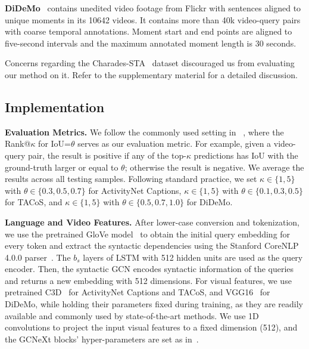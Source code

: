 \documentclass[10pt,twocolumn,letterpaper]{article}
\begin{document}
\noindent\textbf{DiDeMo}~\cite{Hendricks_2017_ICCV} contains unedited video footage from Flickr with sentences aligned to unique moments in its 10642 videos. It contains more than 40k video-query pairs with coarse temporal annotations. Moment start and end points are aligned to five-second intervals and the maximum annotated moment length is 30 seconds.

Concerns regarding the Charades-STA~\cite{Gao_2017_ICCV} dataset discouraged us from evaluating our method on it. Refer to the supplementary material for a detailed discussion. 



\subsection{Implementation}\label{subsec: Impl}
\noindent\textbf{Evaluation Metrics.}
We follow the commonly used setting in ~\cite{gao2017tall}, where the Rank@$\kappa$ for IoU=$\theta$ serves as our evaluation metric. 
For example, given a video-query pair, the result is positive if any of the top-$\kappa$ predictions has IoU with the ground-truth larger or equal to $\theta$; otherwise the result is negative. We average the results across all testing samples. Following standard practice, we set $\kappa \in\{1, 5\}$ with $\theta\in\{0.3,0.5,0.7\}$ for ActivityNet Captions,
$\kappa\in\{1, 5\}$ with $\theta\in\{0.1,0.3,0.5\}$ for TACoS,  and $\kappa\in\{1, 5\}$ with $\theta\in\{0.5,0.7, 1.0\}$ for DiDeMo. 



\noindent\textbf{Language and Video Features.}
After lower-case conversion and tokenization, we use the pretrained GloVe model~\cite{pennington2014glove} to obtain the initial query embedding for every token and extract the syntactic dependencies using the Stanford CoreNLP 4.0.0 parser~\cite{manning2014stanford}. The $b_s$ layers 
of LSTM with 512 hidden units are used as the query encoder.  Then, the syntactic GCN encodes syntactic information of the queries and returns a new embedding with 512 dimensions. For visual features, we use pretrained C3D~\cite{tran2015learning} for ActivityNet Captions and TACoS, and VGG16~\cite{simonyan2014very} for DiDeMo,  while holding their parameters fixed during training, as they are readily available and commonly used by state-of-the-art methods. We use 1D convolutions to project the input visual features to a fixed dimension (512), and the GCNeXt blocks' hyper-parameters are set as in~\cite{Xu_2020_CVPR}. 
\end{document}
